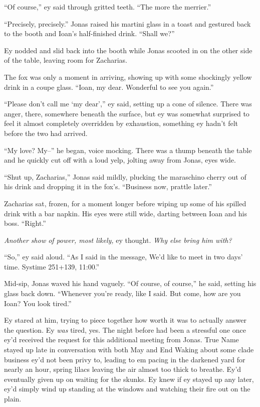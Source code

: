 ``Of course,'' ey said through gritted teeth. ``The more the merrier.''

``Precisely, precisely.'' Jonas raised his martini glass in a toast and gestured back to the booth and Ioan's half-finished drink. ``Shall we?''

Ey nodded and slid back into the booth while Jonas scooted in on the other side of the table, leaving room for Zacharias.

The fox was only a moment in arriving, showing up with some shockingly yellow drink in a coupe glass. ``Ioan, my dear. Wonderful to see you again.''

``Please don't call me `my dear','' ey said, setting up a cone of silence. There was anger, there, somewhere beneath the surface, but ey was somewhat surprised to feel it almost completely overridden by exhaustion, something ey hadn't felt before the two had arrived.

``My love? My--'' he began, voice mocking. There was a thump beneath the table and he quickly cut off with a loud yelp, jolting away from Jonas, eyes wide.

``Shut up, Zacharias,'' Jonas said mildly, plucking the maraschino cherry out of his drink and dropping it in the fox's. ``Business now, prattle later.''

Zacharias sat, frozen, for a moment longer before wiping up some of his spilled drink with a bar napkin. His eyes were still wide, darting between Ioan and his boss. ``Right.''

\emph{Another show of power, most likely,} ey thought. \emph{Why else bring him with?}

``So,'' ey said aloud. ``As I said in the message, We'd like to meet in two days' time. Systime 251+139, 11:00.''

Mid-sip, Jonas waved his hand vaguely. ``Of course, of course,'' he said, setting his glass back down. ``Whenever you're ready, like I said. But come, how are you Ioan? You look tired.''

Ey stared at him, trying to piece together how worth it was to actually answer the question. Ey \emph{was} tired, yes. The night before had been a stressful one once ey'd received the request for this additional meeting from Jonas. True Name stayed up late in conversation with both May and End Waking about some clade business ey'd not been privy to, leading to em pacing in the darkened yard for nearly an hour, spring lilacs leaving the air almost too thick to breathe. Ey'd eventually given up on waiting for the skunks. Ey knew if ey stayed up any later, ey'd simply wind up standing at the windows and watching their fire out on the plain.

